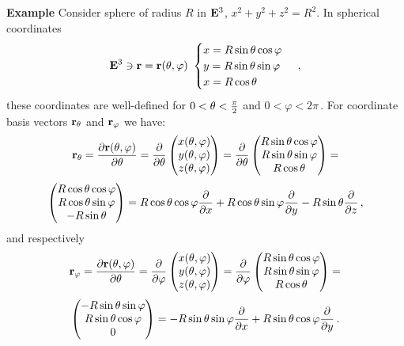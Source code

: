 \documentclass[12pt]{article}
\theoremstyle{theorem}
\numberwithin{equation}{section}
\begin{document}
{\bf Example}  Consider sphere of radius $R$ in
${\bf E}^3$, $x^2+y^2+z^2=R^2$. In spherical coordinates
          \begin{equation*}
      {\bf E}^3 \ni{\bf r}={\bf r}(\theta,\varphi)\,\,
         \begin{cases}
          x=R\sin\theta\cos\varphi\cr
          y=R\sin\theta\sin\varphi\cr
          x=R\cos\theta\cr
         \end{cases}\,,
          \end{equation*}
these coordinates are well-defined for
$0<\theta<{\pi\over 2}$ and $0<\varphi<2\pi$\,.
For coordinate basis  vectors
${\bf r}_\theta$ and ${\bf r}_\varphi$ we have:
          $$
   {\bf r}_\theta=
    {\partial {\bf r}(\theta,\varphi)\over \partial \theta}=
       {\partial\over \partial \theta}
           \begin{pmatrix}
              x(\theta,\varphi)\cr
              y(\theta,\varphi)\cr
              z(\theta,\varphi)\cr
           \end{pmatrix}
             =
       {\partial\over \partial \theta}
           \begin{pmatrix}
              R\sin\theta\cos\varphi\cr
              R\sin\theta\sin\varphi\cr
              R\cos\theta\cr
           \end{pmatrix}=
                 $$
\begin{equation*}
            \begin{pmatrix}
              R\cos\theta\cos\varphi\cr
              R\cos\theta\sin\varphi\cr
              -R\sin\theta\cr
           \end{pmatrix}=
     R\cos\theta\cos\varphi {\partial\over \partial x}
           +
     R\cos\theta\sin\varphi {\partial\over \partial y}
       -R\sin\theta{\partial\over \partial z}\,,
  \end{equation*}
and respectively        $$
   {\bf r}_\varphi=
    {\partial {\bf r}(\theta,\varphi)\over \partial \theta}=
       {\partial\over \partial \varphi}
           \begin{pmatrix}
              x(\theta,\varphi)\cr
              y(\theta,\varphi)\cr
              z(\theta,\varphi)\cr
           \end{pmatrix}
             =
       {\partial\over \partial \varphi}
           \begin{pmatrix}
              R\sin\theta\cos\varphi\cr
              R\sin\theta\sin\varphi\cr
              R\cos\theta\cr
           \end{pmatrix}=
                 $$
\begin{equation}\label{coordinatebasisvectorsforsphere}
            \begin{pmatrix}
              -R\sin\theta\sin\varphi\cr
              R\sin\theta\cos\varphi\cr
                    0\cr
           \end{pmatrix}=
     -R\sin\theta\sin\varphi {\partial\over \partial x}
           +
     R\sin\theta\cos\varphi {\partial\over \partial y}\,.
  \end{equation}
\end{document}
